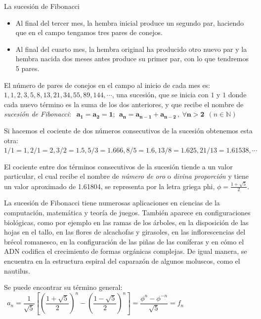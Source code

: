 \begin{myexampleblock}{La sucesión de Fibonacci}
\begin{itemize}
\vspace{-2mm}\item Al final del tercer mes, la hembra inicial produce un segundo par, haciendo que
en el campo tengamos tres pares de conejos.

\vspace{-2mm}\item Al final del cuarto mes, la hembra original ha producido otro nuevo par y la
hembra nacida dos meses antes produce su primer par, con lo que tendremos 5 pares.
\end{itemize}

\vspace{2mm} El número de pares de conejos en el campo al inicio de cada mes es:
$1, 1, 2, 3, 5, 8, 13, 21, 34, 55, 89, 144, \cdots$,
una sucesión, que se inicia con $1$ y $1$ donde cada nuevo término es la suma de los dos anteriores, y que recibe el nombre de \emph{sucesión de Fibonacci}: $\ \ \boldsymbol{ a_1=a_2=1;\ \ a_n=a_{n-1}+a_{n-2}\, , \ \forall n>2 }  \ \ (n\in \mathbb N)$ 

\vspace{2mm} Si hacemos el cociente de dos números consecutivos de la sucesión obtenemos esta otra:
$1/1=1, 2/1=2, 3/2=1.5, 5/3=1.666, 8/5=1.6, 13/8=1.625, 21/13=1.61538, \cdots$

\vspace{2mm} El cociente entre dos términos consecutivos de la sucesión tiende a un valor particular, el cual recibe el nombre de \emph{número de oro} o \emph{divina proporción} y tiene un valor aproximado de 1.61804, se representa por la letra griega phi, $\phi=\frac{1+\sqrt{5}}{2}$. 

\vspace{2mm}  La sucesión de Fibonacci tiene numerosas aplicaciones en ciencias de la computación, matemática y teoría de juegos. También aparece en configuraciones biológicas, como por ejemplo en las ramas de los árboles, en la disposición de las hojas en el tallo, en las flores de alcachofas y girasoles, en las inflorescencias del brécol romanesco, en la configuración de las piñas de las coníferas y en cómo el ADN codifica el crecimiento de formas orgánicas complejas. De igual manera, se encuentra en la estructura espiral del caparazón de algunos moluscos, como el nautilus.


\vspace{4mm} 
\begin{footnotesize}
Se puede encontrar su término general: $\ \ a_n=\dfrac 1{\sqrt{5}} \left[ \left(\dfrac{1+\sqrt{5}}{2}\right)^n-\left(\dfrac{1-\sqrt{5}}{2}\right)^n \right] =\dfrac{\phi^n-\phi^{-n}}{\sqrt{5}}=f_n$
\end{footnotesize}
\end{myexampleblock}



